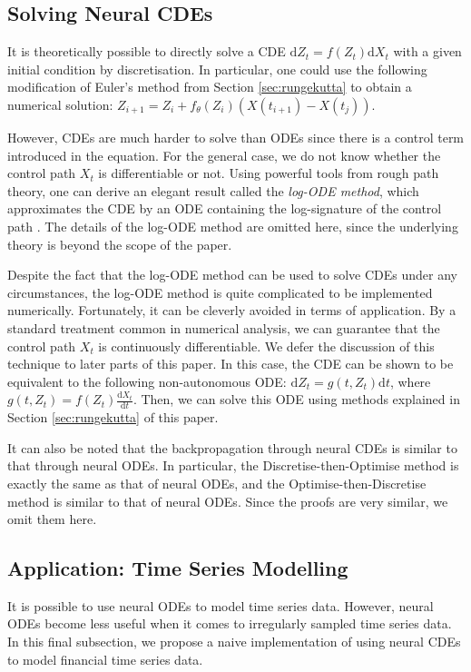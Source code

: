 \documentclass[a4paper,11pt,titlepage]{article}
\theoremstyle{definition}
\theoremstyle{plain}
\theoremstyle{remark}
\begin{document}
\subsection{Solving Neural CDEs}

It is theoretically possible to directly solve a CDE $\mathrm{d}Z_t = f(Z_t)\mathrm{d}X_t$ with a given initial condition by discretisation. In particular, one could use the following modification of Euler's method from Section \ref{sec:rungekutta} to obtain a numerical solution: $Z_{i+1}=Z_i+f_\theta(Z_i)(X(t_{i+1})-X(t_j))$.

However, CDEs are much harder to solve than ODEs since there is a control term introduced in the equation. For the general case, we do not know whether the control path $X_t$ is differentiable or not. Using powerful tools from rough path theory, one can derive an elegant result called the \textit{log-ODE method}, which approximates the CDE by an ODE containing the log-signature of the control path \cite{morrill2021}. The details of the log-ODE method are omitted here, since the underlying theory is beyond the scope of the paper.

Despite the fact that the log-ODE method can be used to solve CDEs under any circumstances, the log-ODE method is quite complicated to be implemented numerically. Fortunately, it can be cleverly avoided in terms of application. By a standard treatment common in numerical analysis, we can guarantee that the control path $X_t$ is continuously differentiable. We defer the discussion of this technique to later parts of this paper. In this case, the CDE can be shown to be equivalent to the following non-autonomous ODE: $\mathrm{d}Z_t=g(t,Z_t)\mathrm{d}t$, where $g(t,Z_t)=f(Z_t)\frac{\mathrm{d}X_t}{\mathrm{d}t}$. Then, we can solve this ODE using methods explained in Section \ref{sec:rungekutta} of this paper.

It can also be noted that the backpropagation through neural CDEs is similar to that through neural ODEs. In particular, the Discretise-then-Optimise method is exactly the same as that of neural ODEs, and the Optimise-then-Discretise method is similar to that of neural ODEs. Since the proofs are very similar, we omit them here.

\subsection{Application: Time Series Modelling}

It is possible to use neural ODEs to model time series data. However, neural ODEs become less useful when it comes to irregularly sampled time series data. In this final subsection, we propose a naive implementation of using neural CDEs to model financial time series data.
\end{document}
